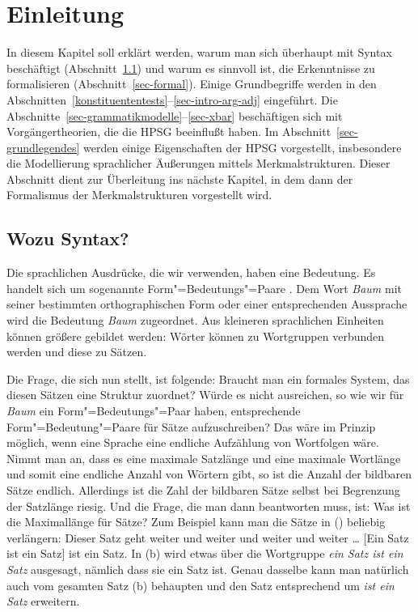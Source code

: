 

\chapter{Einleitung}

In diesem Kapitel soll erklärt werden, warum man sich überhaupt mit Syntax
beschäftigt (Abschnitt~\ref{sec-wozu-syntax}) und 
warum es sinnvoll ist, die Erkenntnisse zu formalisieren (Abschnitt~\ref{sec-formal}).
Einige Grundbegriffe werden in den Abschnitten~\ref{konstituententests}--\ref{sec-intro-arg-adj} eingeführt. 
Die Abschnitte~\ref{sec-grammatikmodelle}--\ref{sec-xbar}
beschäftigen sich mit Vorgängertheorien, die die HPSG beeinflußt haben.
Im Abschnitt~\ref{sec-grundlegendes} werden einige Eigenschaften der HPSG
vorgestellt, insbesondere die Modellierung sprachlicher Äußerungen mittels
Merkmalstrukturen. Dieser Abschnitt dient zur Überleitung ins nächste Kapitel,
in dem dann der Formalismus der Merkmalstrukturen vorgestellt wird.

\section{Wozu Syntax?}
\label{sec-wozu-syntax}

Die sprachlichen Ausdrücke, die wir verwenden, haben eine Bedeutung. Es handelt
sich um sogenannte Form"=Bedeutungs"=Paare \citep{Saussure16a-de}. Dem Wort \emph{Baum}
mit seiner bestimmten orthographischen Form oder einer entsprechenden Aussprache
wird die Bedeutung \emph{Baum} zugeordnet. Aus kleineren sprachlichen Einheiten
können größere gebildet werden: Wörter können zu Wortgruppen verbunden werden
und diese zu Sätzen.

Die Frage, die sich nun stellt, ist folgende: Braucht man ein formales System, das
diesen Sätzen eine Struktur zuordnet? Würde es nicht ausreichen, so wie wir
für \emph{Baum} ein Form"=Bedeutungs"=Paar haben, entsprechende Form"=Bedeutung"=Paare
für Sätze aufzuschreiben? Das wäre im Prinzip möglich, wenn eine Sprache eine
endliche Aufzählung von Wortfolgen wäre. Nimmt man an,
dass es eine maximale Satzlänge und eine maximale Wortlänge und somit eine endliche
Anzahl von Wörtern gibt, so ist die Anzahl der bildbaren Sätze endlich.
Allerdings ist die Zahl der bildbaren Sätze selbst bei Begrenzung der Satzlänge riesig.
Und die Frage, die man dann beantworten muss, ist: Was ist die Maximallänge für
Sätze? Zum Beispiel kann man die Sätze in () beliebig verlängern:
\eal
\ex Dieser Satz geht weiter und weiter und weiter und weiter \ldots
\ex {}[Ein Satz ist ein Satz] ist ein Satz.
\zl
In (b) wird etwas über die Wortgruppe \emph{ein Satz ist ein Satz} ausgesagt, nämlich dass sie
ein Satz ist. Genau dasselbe kann man natürlich auch vom gesamten Satz (b) behaupten und den Satz
entsprechend um \emph{ist ein Satz} erweitern.

